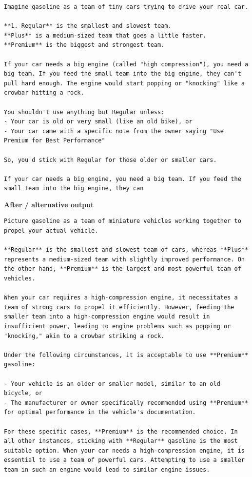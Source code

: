 \begin{Verbatim}
Imagine gasoline as a team of tiny cars trying to drive your real car.

**1. Regular** is the smallest and slowest team.
**Plus** is a medium-sized team that goes a little faster.
**Premium** is the biggest and strongest team.

If your car needs a big engine (called "high compression"), you need a big team. If you feed the small team into the big engine, they can't pull hard enough. The engine would start popping or "knocking" like a crowbar hitting a rock.

You shouldn't use anything but Regular unless:
- Your car is old or very small (like an old bike), or
- Your car came with a specific note from the owner saying "Use Premium for Best Performance"

So, you'd stick with Regular for those older or smaller cars.

If your car needs a big engine, you need a big team. If you feed the small team into the big engine, they can
\end{Verbatim}

\textbf{After / alternative output}

\begin{Verbatim}
Picture gasoline as a team of miniature vehicles working together to propel your actual vehicle.

**Regular** is the smallest and slowest team of cars, whereas **Plus** represents a medium-sized team with slightly improved performance. On the other hand, **Premium** is the largest and most powerful team of vehicles.

When your car requires a high-compression engine, it necessitates a team of strong cars to propel it efficiently. However, feeding the smaller team into a high-compression engine would result in insufficient power, leading to engine problems such as popping or "knocking," akin to a crowbar striking a rock.

Under the following circumstances, it is acceptable to use **Premium** gasoline:

- Your vehicle is an older or smaller model, similar to an old bicycle, or
- The manufacturer or owner specifically recommended using **Premium** for optimal performance in the vehicle's documentation.

For these specific cases, **Premium** is the recommended choice. In all other instances, sticking with **Regular** gasoline is the most suitable option. When your car needs a high-compression engine, it is essential to use a team of powerful cars. Attempting to use a smaller team in such an engine would lead to similar engine issues.
\end{Verbatim}


